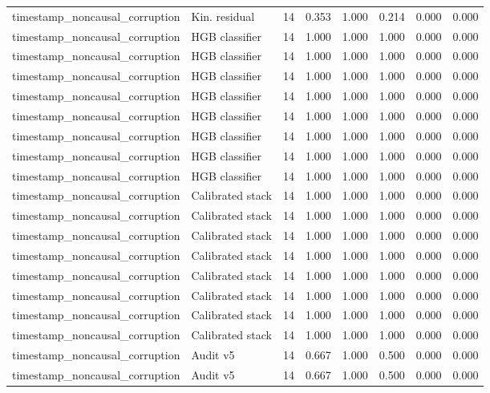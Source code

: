 {\begin{longtable}{llrrrrrr}
timestamp\_noncausal\_corruption & Kin. residual & 14 & 0.353 & 1.000 & 0.214 & 0.000 & 0.000 \\
timestamp\_noncausal\_corruption & HGB classifier & 14 & 1.000 & 1.000 & 1.000 & 0.000 & 0.000 \\
timestamp\_noncausal\_corruption & HGB classifier & 14 & 1.000 & 1.000 & 1.000 & 0.000 & 0.000 \\
timestamp\_noncausal\_corruption & HGB classifier & 14 & 1.000 & 1.000 & 1.000 & 0.000 & 0.000 \\
timestamp\_noncausal\_corruption & HGB classifier & 14 & 1.000 & 1.000 & 1.000 & 0.000 & 0.000 \\
timestamp\_noncausal\_corruption & HGB classifier & 14 & 1.000 & 1.000 & 1.000 & 0.000 & 0.000 \\
timestamp\_noncausal\_corruption & HGB classifier & 14 & 1.000 & 1.000 & 1.000 & 0.000 & 0.000 \\
timestamp\_noncausal\_corruption & HGB classifier & 14 & 1.000 & 1.000 & 1.000 & 0.000 & 0.000 \\
timestamp\_noncausal\_corruption & HGB classifier & 14 & 1.000 & 1.000 & 1.000 & 0.000 & 0.000 \\
timestamp\_noncausal\_corruption & Calibrated stack & 14 & 1.000 & 1.000 & 1.000 & 0.000 & 0.000 \\
timestamp\_noncausal\_corruption & Calibrated stack & 14 & 1.000 & 1.000 & 1.000 & 0.000 & 0.000 \\
timestamp\_noncausal\_corruption & Calibrated stack & 14 & 1.000 & 1.000 & 1.000 & 0.000 & 0.000 \\
timestamp\_noncausal\_corruption & Calibrated stack & 14 & 1.000 & 1.000 & 1.000 & 0.000 & 0.000 \\
timestamp\_noncausal\_corruption & Calibrated stack & 14 & 1.000 & 1.000 & 1.000 & 0.000 & 0.000 \\
timestamp\_noncausal\_corruption & Calibrated stack & 14 & 1.000 & 1.000 & 1.000 & 0.000 & 0.000 \\
timestamp\_noncausal\_corruption & Calibrated stack & 14 & 1.000 & 1.000 & 1.000 & 0.000 & 0.000 \\
timestamp\_noncausal\_corruption & Calibrated stack & 14 & 1.000 & 1.000 & 1.000 & 0.000 & 0.000 \\
timestamp\_noncausal\_corruption & Audit v5 & 14 & 0.667 & 1.000 & 0.500 & 0.000 & 0.000 \\
timestamp\_noncausal\_corruption & Audit v5 & 14 & 0.667 & 1.000 & 0.500 & 0.000 & 0.000 \\

\end{longtable}}
